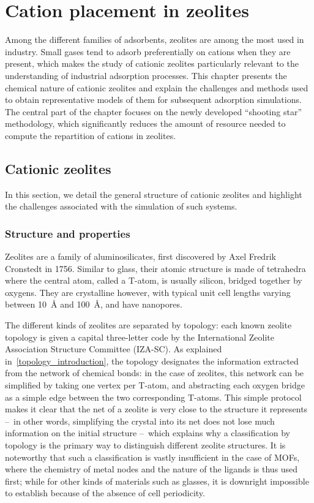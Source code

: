 \documentclass[main.tex]{subfiles}
\begin{document}
\chapter{Cation placement in zeolites}\label{cationzeolites}
\vspace*{-1\baselineskip}

Among the different families of adsorbents, zeolites are among the most used in industry. Small gases tend to adsorb preferentially on cations when they are present, which makes the study of cationic zeolites particularly relevant to the understanding of industrial adsorption processes. This chapter presents the chemical nature of cationic zeolites and explain the challenges and methods used to obtain representative models of them for subsequent adsorption simulations. The central part of the chapter focuses on the newly developed ``shooting star'' methodology, which significantly reduces the amount of resource needed to compute the repartition of cations in zeolites.

\section{Cationic zeolites}

In this section, we detail the general structure of cationic zeolites and highlight the challenges associated with the simulation of such systems.

\subsection{Structure and properties}

Zeolites are a family of aluminosilicates, first discovered by Axel Fredrik Cronstedt in 1756. Similar to glass, their atomic structure is made of tetrahedra where the central atom, called a T-atom, is usually silicon, bridged together by oxygens. They are crystalline however, with typical unit cell lengths varying between \qty{10}{\angstrom} and \qty{100}{\angstrom}, and have nanopores.

The different kinds of zeolites are separated by topology: each known zeolite topology is given a capital three-letter code by the International Zeolite Association Structure Committee (IZA-SC). As explained in~\cref{topology_introduction}, the topology designates the information extracted from the network of chemical bonds: in the case of zeolites, this network can be simplified by taking one vertex per T-atom, and abstracting each oxygen bridge as a simple edge between the two corresponding T-atoms. This simple protocol makes it clear that the net of a zeolite is very close to the structure it represents --~in other words, simplifying the crystal into its net does not lose much information on the initial structure --~which explains why a classification by topology is the primary way to distinguish different zeolite structures. It is noteworthy that such a classification is vastly insufficient in the case of MOFs, where the chemistry of metal nodes and the nature of the ligands is thus used first; while for other kinds of materials such as glasses, it is downright impossible to establish because of the absence of cell periodicity.
\end{document}
